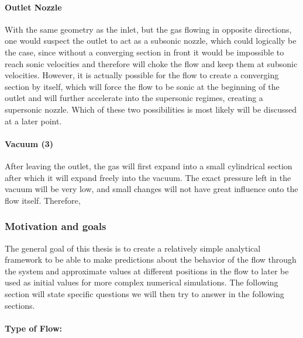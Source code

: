 \paragraph{Outlet Nozzle}
	
	With the same geometry as the inlet, but the gas flowing in opposite directions, one would suspect the outlet to act as a subsonic nozzle, which could logically be the case, since without a converging section in front it would be impossible to reach sonic velocities and therefore will choke the flow and keep them at subsonic velocities. However, it is actually possible for the flow to create a converging section by itself, which will force the flow to be sonic at the beginning of the outlet and will further accelerate into the supersonic regimes, creating a supersonic nozzle. Which of these two possibilities is most likely will be discussed at a later point.

\paragraph{Vacuum (3)}

	After leaving the outlet, the gas will first expand into a small cylindrical section after which it will expand freely into the vacuum. The exact pressure left in the vacuum will be very low, and small changes will not have great influence onto the flow itself. Therefore,

\newpage

\subsubsection{Motivation and goals}

	The general goal of this thesis is to create a relatively simple analytical framework to be able to make predictions about the behavior of the flow through the system and approximate values at different positions in the flow to later be used as initial values for more complex numerical simulations. The following section will state specific questions we will then try to answer in the following sections.

\paragraph{Type of Flow:}

